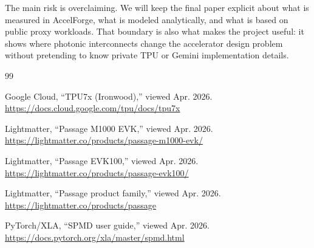 \documentclass[conference,onecolumn]{IEEEtran}
\begin{document}
The main risk is overclaiming. We will keep the final paper explicit about what
is measured in AccelForge, what is modeled analytically, and what is based on
public proxy workloads. That boundary is also what makes the project useful:
it shows where photonic interconnects change the accelerator design problem
without pretending to know private TPU or Gemini implementation details.

\begin{thebibliography}{99}

Google Cloud, ``TPU7x (Ironwood),'' viewed Apr. 2026.
\url{https://docs.cloud.google.com/tpu/docs/tpu7x}

Lightmatter, ``Passage M1000 EVK,'' viewed Apr. 2026.
\url{https://lightmatter.co/products/passage-m1000-evk/}

Lightmatter, ``Passage EVK100,'' viewed Apr. 2026.
\url{https://lightmatter.co/products/passage-evk100/}

Lightmatter, ``Passage product family,'' viewed Apr. 2026.
\url{https://lightmatter.co/products/passage}

PyTorch/XLA, ``SPMD user guide,'' viewed Apr. 2026.
\url{https://docs.pytorch.org/xla/master/spmd.html}

\end{thebibliography}
\end{document}
